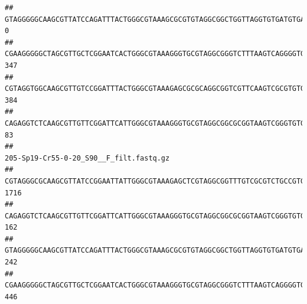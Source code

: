 \documentclass[]{article}
\begin{document}
\begin{verbatim}
## GTAGGGGGCAAGCGTTATCCAGATTTACTGGGCGTAAAGCGCGTGTAGGCGGCTGGTTAGGTGTGATGTGAAATCTTCCGGCTCAACCGGAAAACTGCATTGCAAACCGGCCTGGCTAGAGTGCAGGAGAGGGAAGCGGAATTCCAGGTGTAGCGGTGAAATGCGTAGATATCTGGAGGAACACCAGTGGCGAAGGCGGCTTCCTGGCCTGCAACTGACGCTGAGACGCGAAAGCGTGGGGAGCGAAC                                        0
## CGAAGGGGGCTAGCGTTGCTCGGAATCACTGGGCGTAAAGGGTGCGTAGGCGGGTCTTTAAGTCAGGGGTGAAATCCTGGAGCTCAACTCCAGAACTGCCTTTGATACTGAAGATCTTGAGTTCGGGAGAGGTGAGTGGAACTGCGAGTGTAGAGGTGAAATTCGTAGATATTCGCAAGAACACCAGTGGCGAAGGCGGCTCACTGGCCCGATACTGACGCTGAGGCACGAAAGCGTGGGGAGCAAACA                                     347
## CGTAGGTGGCAAGCGTTGTCCGGATTTACTGGGCGTAAAGAGCGCGCAGGCGGTCGTTCAAGTCGCGTGTGAAAGCCCCCGGCTCAACTGGGGAGGGTCACGCGATACTGATCGACTCGAAGGCAGGAGAGGGTAGTGGAATTCCCGGTGTAGTGGTGAAATGCGTAGATATCGGGAGGAACACCAGTGGCGAAGGCGACTACCTGGCCTGTTCTTGACGCTGAGGCGCGAAAGCTAGGGGAGCAAACG                                     384
## CAGAGGTCTCAAGCGTTGTTCGGATTCATTGGGCGTAAAGGGTGCGTAGGCGGCGCGGTAAGTCGGGTGTGAAATCTCGGGGCTTAACTCCGAAACTGCATTCGATACTGCCGTGCTTGAGGACTGGAGAGGAGACTGGAATTTACGGTGTAGCGGTGAAATGCGTAGATATCGTAAGGAAGACCAGTGGCGAAGGCGGGTCTCTGGACAGTTCCTGACGCTGAGGCACGAAGGCCAGGGGAGCAAACG                                      83
##                                                                                                                                                                                                                                                           205-Sp19-Cr55-0-20_S90__F_filt.fastq.gz
## CGTAGGGCGCAAGCGTTATCCGGAATTATTGGGCGTAAAGAGCTCGTAGGCGGTTTGTCGCGTCTGCCGTGAAAGTCCGGGGCTCAACTCCGGATCTGCGGTGGGTACGGGCAGACTAGAGTGATGTAGGGGAGACTGGAATTCCTGGTGTAGCGGTGAAATGCGCAGATATCAGGAGGAACACCGATGGCGAAGGCAGGTCTCTGGGCATTAACTGACGCTGAGGAGCGAAAGCATGGGGAGCGAACA                                    1716
## CAGAGGTCTCAAGCGTTGTTCGGATTCATTGGGCGTAAAGGGTGCGTAGGCGGCGCGGTAAGTCGGGTGTGAAATCTCGGAGCTTAACTCCGAAACTGCATTCGATACTGCCGTGCTTGAGGACTGGAGAGGAGACTGGAATTTACGGTGTAGCGGTGAAATGCGTAGATATCGTAAGGAAGACCAGTGGCGAAGGCGGGTCTCTGGACAGTTCCTGACGCTGAGGCACGAAGGCCAGGGGAGCAAACG                                     162
## GTAGGGGGCAAGCGTTATCCAGATTTACTGGGCGTAAAGCGCGTGTAGGCGGCTGGTTAGGTGTGATGTGAAATCTTCCGGCTCAACCGGAAAACTGCATTGCAAACCGGCCTGGCTAGAGTGCAGGAGAGGGAAGCGGAATTCCAGGTGTAGCGGTGAAATGCGTAGATATCTGGAGGAACACCAGTGGCGAAGGCGGCTTCCTGGCCTGCAACTGACGCTGAGACGCGAAAGCGTGGGGAGCGAAC                                      242
## CGAAGGGGGCTAGCGTTGCTCGGAATCACTGGGCGTAAAGGGTGCGTAGGCGGGTCTTTAAGTCAGGGGTGAAATCCTGGAGCTCAACTCCAGAACTGCCTTTGATACTGAAGATCTTGAGTTCGGGAGAGGTGAGTGGAACTGCGAGTGTAGAGGTGAAATTCGTAGATATTCGCAAGAACACCAGTGGCGAAGGCGGCTCACTGGCCCGATACTGACGCTGAGGCACGAAAGCGTGGGGAGCAAACA                                     446

\end{verbatim}
\end{document}
